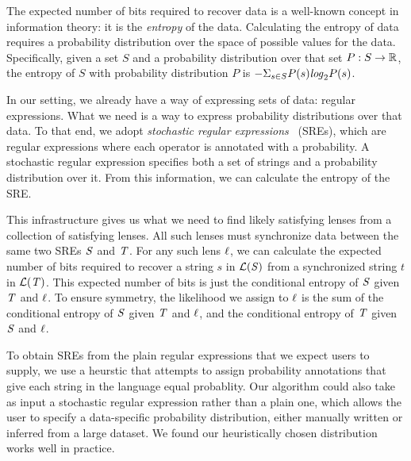 \documentclass[acmsmall,screen,anonymous]{acmart}
\begin{document}
The expected number of bits required to recover data is a well-known concept in
information theory: it is the \emph{entropy} of the data. Calculating the
entropy of data requires a probability distribution over the space of possible
values for the data. Specifically, given a set $S$ and a probability
distribution over that set $P : S \rightarrow \mathbb{R}$, the entropy of $S$
with probability distribution $P$ is $-\Sigma_{s\in S}P(s)\mathit{log}_2P(s)$.

In our setting, we already have a way of expressing sets of data:
regular expressions.  What we need is a way to express probability
distributions over that data.
To that end, we adopt \emph{stochastic regular expressions}~\cite{?} (SREs), 
which are regular expressions where each operator is annotated with a
probability.  A stochastic regular expression
specifies both a set of strings and a probability
distribution over it.  From this information, we can calculate the
entropy of the SRE. 

This infrastructure gives us what we need to find likely satisfying lenses from
a collection of satisfying lenses. All such lenses must synchronize data between
the same two SREs $\mathit{S}$ and $\mathit{T}$. For any such lens $\mathit{\ell}$, we can
calculate the expected number of bits required to recover a string $s$ in
$\mathcal{L}(\mathit{S})$ from a synchronized string $t$ in
$\mathcal{L}(\mathit{T})$. This expected number of bits is just the conditional
entropy of $\mathit{S}$ given $\mathit{T}$ and $\mathit{\ell}$. To ensure symmetry, the
likelihood we assign to $\mathit{\ell}$ is the sum of the conditional entropy of
$\mathit{S}$ given $\mathit{T}$ and $\mathit{\ell}$,  and the conditional entropy of $\mathit{T}$ given $\mathit{S}$ and
$\mathit{\ell}$.

To obtain SREs from the plain regular expressions that we expect users to
supply, we use a heurstic that attempts to assign probability annotations that
give each string in the language equal probablity. Our algorithm could also take
as input a stochastic regular expression rather than a plain one, which allows
the user to specify a data-specific probability distribution, either manually
written or inferred from a large dataset. We found our heuristically chosen
distribution works well in practice.
\end{document}
